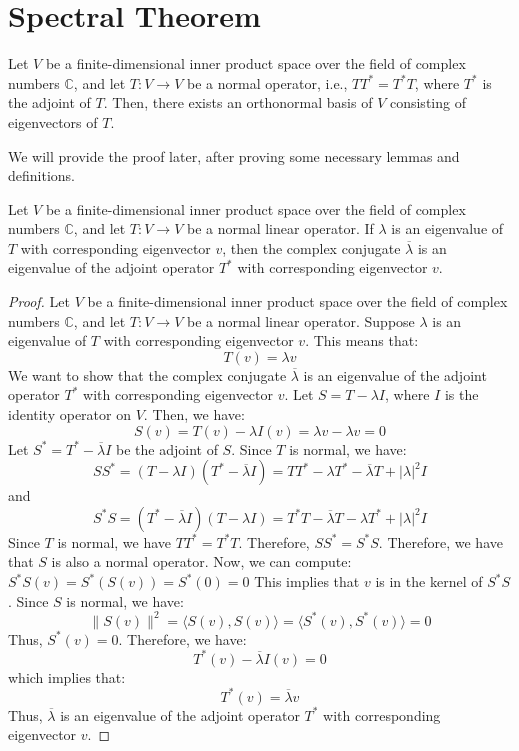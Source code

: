 \documentclass[openany]{book}
\renewcommand{\C}{\mathbb{C}}
\begin{document}
\section{Spectral Theorem}
\begin{mytheorem}
Let $V$ be a finite-dimensional inner product space over the field of complex numbers $\C$, and let $T: V \to V$ be a normal operator, i.e., $TT^* = T^*T$, where $T^*$ is the adjoint of $T$. Then, there exists an orthonormal basis of $V$ consisting of eigenvectors of $T$.
\end{mytheorem}
We will provide the proof later, after proving some necessary lemmas and definitions.
\begin{mytheorem}
    Let $V$ be a finite-dimensional inner product space over the field of complex numbers $\C$, and let $T: V \to V$ be a normal linear operator. If $\lambda$ is an eigenvalue of $T$ with corresponding eigenvector $v$, then the complex conjugate $\overline{\lambda}$ is an eigenvalue of the adjoint operator $T^*$ with corresponding eigenvector $v$.
\end{mytheorem}
\begin{proof}
Let $V$ be a finite-dimensional inner product space over the field of complex numbers $\C$, and let $T: V \to V$ be a normal linear operator. Suppose $\lambda$ is an eigenvalue of $T$ with corresponding eigenvector $v$. This means that:
$$T(v) = \lambda v$$
We want to show that the complex conjugate $\overline{\lambda}$ is an eigenvalue of the adjoint operator $T^*$ with corresponding eigenvector $v$. Let $S = T - \lambda I$, where $I$ is the identity operator on $V$. Then, we have:
$$S(v) = T(v) - \lambda I(v) = \lambda v - \lambda v = 0$$
Let $S^* = T^* - \overline{\lambda} I$ be the adjoint of $S$. Since $T$ is normal, we have:
$$SS^* = (T - \lambda I)(T^* - \overline{\lambda} I) = TT^* - \lambda T^* - \overline{\lambda} T + |\lambda|^2 I$$
and
$$S^*S = (T^* - \overline{\lambda} I)(T - \lambda I) = T^*T - \overline{\lambda} T - \lambda T^* + |\lambda|^2 I$$
Since $T$ is normal, we have $TT^* = T^*T$. Therefore, $SS^* = S^*S$. Therefore, we have that $S$ is also a normal operator. Now, we can compute:
$S^*S(v) = S^*(S(v)) = S^*(0) = 0$
This implies that $v$ is in the kernel of $S^*S$. Since $S$ is normal, we have:
$$\|S(v)\|^2 = \langle S(v), S(v) \rangle = \langle S^*(v), S^*(v) \rangle = 0$$
Thus, $S^*(v) = 0$. Therefore, we have:
$$T^*(v) - \overline{\lambda} I(v) = 0
$$which implies that:
$$T^*(v) = \overline{\lambda} v$$
Thus, $\overline{\lambda}$ is an eigenvalue of the adjoint operator $T^*$ with corresponding eigenvector $v$.
\end{proof}
\end{document}
